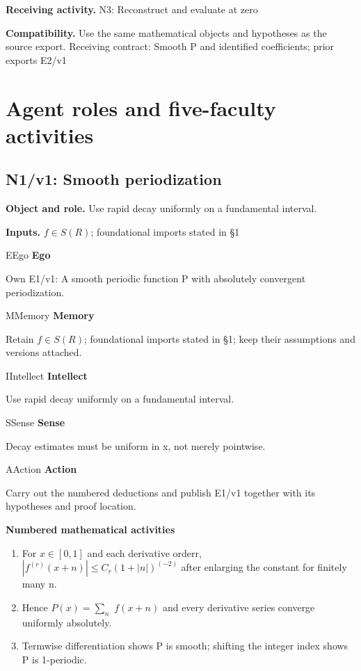 \documentclass[preprint,12pt,aps,pra,showkeys,amsmath,amssymb,superscriptaddress,floatfix]{revtex4-2}
\theoremstyle{definition}
\theoremstyle{remark}
\newcommand{\mmfaculty}[3]{%
 \begin{mmfacultybox}{#1}{#2}
 {\sffamily\bfseries\color{MMBlue}#2}\par\smallskip #3
 \end{mmfacultybox}}
\newcommand{\field}[2]{\par\smallskip\noindent\textbf{#1.} #2\par}
\begin{document}
\field{Receiving activity}{N3: Reconstruct and evaluate at zero}

\field{Compatibility}{Use the same mathematical objects and hypotheses as the source export.
Receiving contract: Smooth P and identified coefficients; prior exports
E2/v1}

\endgroup

\clearpage\section{Agent roles and five-faculty activities}\begingroup\small\linespread{1.05}\selectfont{}

\subsection{N1/v1: Smooth periodization}

\field{Object and role}{Use rapid decay uniformly on a fundamental interval.}

\field{Inputs}{\(f\in S(R)\); foundational imports stated in §1}

\mmfaculty{E}{Ego}{Own E1/v1: A smooth periodic function P with absolutely convergent
periodization.}

\mmfaculty{M}{Memory}{Retain \(f\in S(R)\); foundational imports stated in §1; keep their
assumptions and versions attached.}

\mmfaculty{I}{Intellect}{Use rapid decay uniformly on a fundamental interval.}

\mmfaculty{S}{Sense}{Decay estimates must be uniform in x, not merely pointwise.}

\mmfaculty{A}{Action}{Carry out the numbered deductions and publish E1/v1 together with its
hypotheses and proof location.}

\smallskip\noindent\textbf{Numbered mathematical activities}

\begin{enumerate}[label=N1.\arabic*,leftmargin=3.4em]

\item For \(x\in [0,1]\) and each derivative orderr,
\(|f^{(r)}(x+n)|\le C_r(1+|n|)^{(-2)}\) after enlarging the constant for
finitely many n.

\item Hence \(P(x)=\sum _n\) \(f(x+n)\) and every derivative series converge
uniformly absolutely.

\item Termwise differentiation shows P is smooth; shifting the integer index
shows P is 1-periodic.

\end{enumerate}
\end{document}
